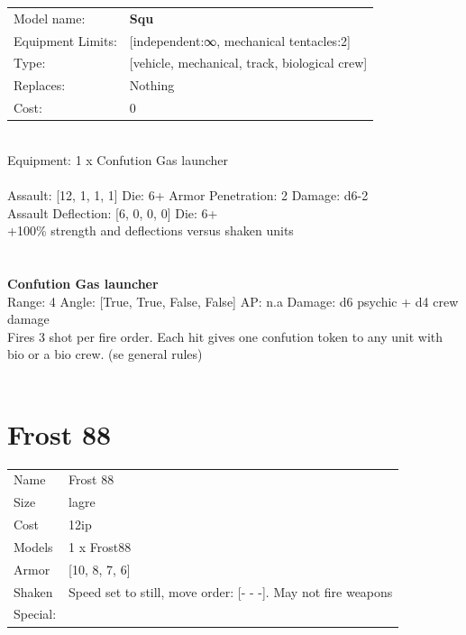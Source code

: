 \noindent
\begin{tabular}{ll}
Model name: &{\bf Squ } \\
Equipment Limits: &[independent:∞, mechanical tentacles:2] \\
Type: &[vehicle, mechanical, track, biological crew] \\
Replaces: &Nothing \\
Cost: & 0\\
\end{tabular}
\ \\
Equipment: 1 x Confution Gas launcher \\
\ \\
Assault: [12, 1, 1, 1] Die: 6+ Armor Penetration: 2 Damage: d6-2 \\
Assault Deflection: [6, 0, 0, 0] Die: 6+\\
\indent +100\% strength and deflections versus shaken units\\ 
 
\ \\

\ \\
{\bf Confution Gas launcher } \\



Range: 4  Angle: [True, True, False, False] AP: n.a Damage: d6 psychic + d4 crew damage \\
Fires 3 shot per fire order. Each hit gives one confution token to any unit with bio or a bio crew. (se general rules)\\ 




 
\ \\













\clearpage

\section{ Frost 88 }

\begin{tabular}{ll}
  Name & Frost 88 \\
  Size & lagre\\
  Cost & 12ip\\
  Models & 1 x Frost88\\
  Armor & [10, 8, 7, 6]\\
  Shaken & Speed set to still, move order: [- - -]. May not fire weapons\\
  Special: \\
\end{tabular}

